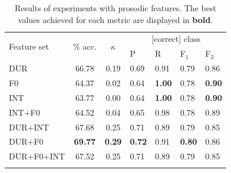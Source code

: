 \documentclass[a4paper]{article}
\begin{document}
		
		\begin{table}[!b]
			\centering
			\caption[Results of experiments with prosodic features]{Results of experiments with prosodic features.%
			The best values achieved for each metric are displayed in \textbf{bold}.
			}
			\begin{tabularx}{\columnwidth}{lccXXXX}			
			
			\toprule
			\multirow{2}{*}{Feature set} & \multirow{2}{*}{\% acc.} & \multirow{2}{*}{$\kappa$} & \multicolumn{4}{c}{[correct] class} \\
			 \cmidrule(lr){4-7}
			& & & P & R & F$_1$ & F$_2$ \\
			\midrule
		
DUR	&	66.78	&	0.19	&	0.69	&	0.91	&	0.79	&	0.86	\\
F0		&	64.37	&	0.02	&	0.64	&	\textbf{1.00}	&	0.78	&	\textbf{0.90}	\\
INT		&	63.77	&	0.00	&	0.64	&	\textbf{1.00}	&	0.78	&	\textbf{0.90}	\\
INT+F0		&	64.52	&	0.04	&	0.65	&	0.98	&	0.78	&	0.89	\\
DUR+INT	&	67.68	&	0.25	&	0.71	&	0.89	&	0.79	&	0.85	\\
DUR+F0		&	\textbf{69.77}	&	\textbf{0.29}	&	\textbf{0.72}	&	0.91	&	\textbf{0.80}	&	0.86	\\
DUR+F0+INT &	67.52	&	0.25	&	0.71	&	0.89	&	0.79	&	0.85	\\		
			\bottomrule
			\label{tab:results:prosody}
			\end{tabularx}
		\end{table}	
		
\end{document}
